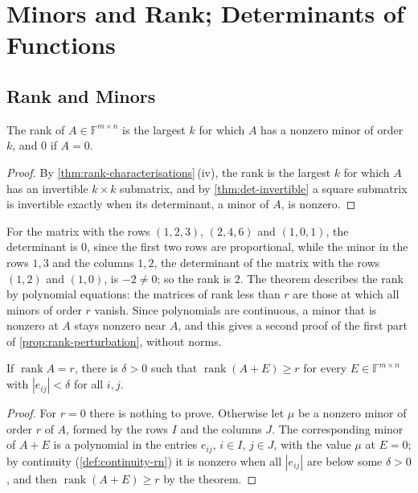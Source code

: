 \section{Minors and Rank; Determinants of Functions}
\label{sec:minors-functions}

\subsection{Rank and Minors}

\begin{theorem}
\label{thm:rank-minors}
The rank of $A\in\mathbb F^{m\times n}$ is the largest $k$ for which $A$ has a nonzero minor of order $k$, and $0$ if $A=0$.
\end{theorem}

\begin{proof}
By \cref{thm:rank-characterisations}\,(iv), the rank is the largest $k$ for which $A$ has an invertible $k\times k$ submatrix, and by \cref{thm:det-invertible} a square submatrix is invertible exactly when its determinant, a minor of $A$, is nonzero.
\end{proof}

For the matrix with the rows $(1,2,3)$, $(2,4,6)$ and $(1,0,1)$, the determinant is $0$, since the first two rows are proportional, while the minor in the rows $1,3$ and the columns $1,2$, the determinant of the matrix with the rows $(1,2)$ and $(1,0)$, is $-2\ne0$; so the rank is $2$. The theorem describes the rank by polynomial equations: the matrices of rank less than $r$ are those at which all minors of order $r$ vanish. Since polynomials are continuous, a minor that is nonzero at $A$ stays nonzero near $A$, and this gives a second proof of the first part of \cref{prop:rank-perturbation}, without norms.

\begin{corollary}
\label{cor:rank-lsc}
If $\operatorname{rank}A=r$, there is $\delta>0$ such that $\operatorname{rank}(A+E)\ge r$ for every $E\in\mathbb F^{m\times n}$ with $|e_{ij}|<\delta$ for all $i,j$.
\end{corollary}

\begin{proof}
For $r=0$ there is nothing to prove. Otherwise let $\mu$ be a nonzero minor of order $r$ of $A$, formed by the rows $I$ and the columns $J$. The corresponding minor of $A+E$ is a polynomial in the entries $e_{ij}$, $i\in I$, $j\in J$, with the value $\mu$ at $E=0$; by continuity (\cref{def:continuity-rn}) it is nonzero when all $|e_{ij}|$ are below some $\delta>0$, and then $\operatorname{rank}(A+E)\ge r$ by the theorem.
\end{proof}

